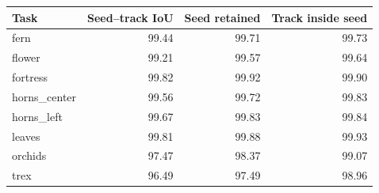 \begin{tabular}{lrrr}
\toprule
Task & Seed--track IoU & Seed retained & Track inside seed \\
\midrule
fern & 99.44 & 99.71 & 99.73 \\
flower & 99.21 & 99.57 & 99.64 \\
fortress & 99.82 & 99.92 & 99.90 \\
horns\_center & 99.56 & 99.72 & 99.83 \\
horns\_left & 99.67 & 99.83 & 99.84 \\
leaves & 99.81 & 99.88 & 99.93 \\
orchids & 97.47 & 98.37 & 99.07 \\
trex & 96.49 & 97.49 & 98.96 \\
\bottomrule
\end{tabular}
